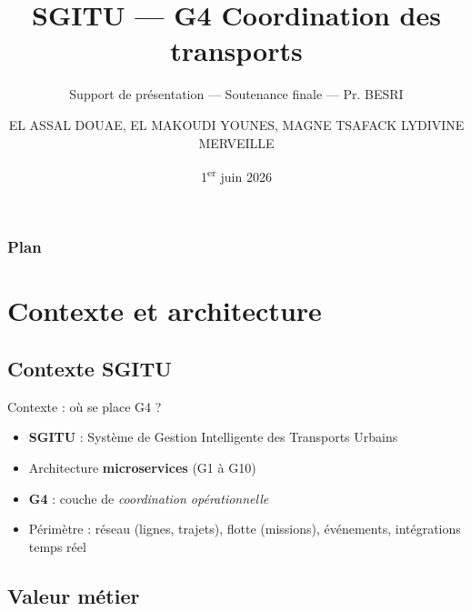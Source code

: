 \documentclass[aspectratio=169,xcolor=table]{beamer}
\begin{document}
\title[SGITU]{SGITU — G4 Coordination des transports}
\subtitle{Support de présentation — Soutenance finale — Pr. BESRI}
\author{EL ASSAL DOUAE, EL MAKOUDI YOUNES, MAGNE TSAFACK LYDIVINE MERVEILLE}
\date{1\textsuperscript{er} juin 2026}

\frame[noframenumbering]{\titlepage}

\begin{frame}
  \frametitle{Plan}
  \tableofcontents
\end{frame}

\section{Contexte et architecture}

\subsection{Contexte SGITU}

\begin{frame}{Contexte : où se place G4 ?}
  \begin{itemize}
    \item \textbf{SGITU} : Système de Gestion Intelligente des Transports Urbains
    \item Architecture \textbf{microservices} (G1 à G10)
    \item \textbf{G4} : couche de \textit{coordination opérationnelle}
    \item Périmètre : réseau (lignes, trajets), flotte (missions), événements, intégrations temps réel
  \end{itemize}
  \vspace{0.4cm}
  \begin{center}
  \end{center}
\end{frame}

\subsection{Valeur métier}
\end{document}
